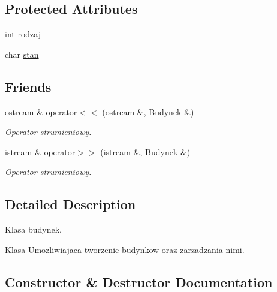 \subsection*{Protected Attributes}
\begin{DoxyCompactItemize}
\item 
int \hyperlink{class_budynek_a99ad6ea24ed1e4d9acbe2855142de9b0}{rodzaj}
\item 
char \hyperlink{class_budynek_a790ff1e35e2c213152c6436fbb6ee285}{stan}
\end{DoxyCompactItemize}
\subsection*{Friends}
\begin{DoxyCompactItemize}
\item 
\hypertarget{class_budynek_a8e6044eb13005ebfaf1787db6fc51f59}{}ostream \& \hyperlink{class_budynek_a8e6044eb13005ebfaf1787db6fc51f59}{operator$<$$<$} (ostream \&, \hyperlink{class_budynek}{Budynek} \&)\label{class_budynek_a8e6044eb13005ebfaf1787db6fc51f59}

\begin{DoxyCompactList}\small\item\em Operator strumieniowy. \end{DoxyCompactList}\item 
\hypertarget{class_budynek_a8ad34897c6d555d7818558e38ef191c9}{}istream \& \hyperlink{class_budynek_a8ad34897c6d555d7818558e38ef191c9}{operator$>$$>$} (istream \&, \hyperlink{class_budynek}{Budynek} \&)\label{class_budynek_a8ad34897c6d555d7818558e38ef191c9}

\begin{DoxyCompactList}\small\item\em Operator strumieniowy. \end{DoxyCompactList}\end{DoxyCompactItemize}


\subsection{Detailed Description}
Klasa budynek. 

Klasa Umozliwiajaca tworzenie budynkow oraz zarzadzania nimi. 

\subsection{Constructor \& Destructor Documentation}
\hypertarget{class_budynek_a6130ff6245a4f097247c7f6ab68d14e2}{}
